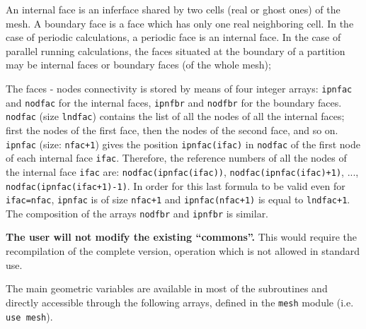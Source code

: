{{{
An internal face is an inferface shared by two cells (real or ghost
ones) of the mesh. A boundary face is a face which has only one real
neighboring cell. In the case of periodic calculations, a periodic face
is an internal face. In the case of parallel running calculations, the
faces situated at the boundary of a partition may be internal faces or
boundary faces (of the whole mesh);

\label{prg_nodfac}
The faces - nodes connectivity is stored by
means of four integer arrays: \texttt{ipnfac} and \texttt{nodfac} for the
internal faces, \texttt{ipnfbr} and \texttt{nodfbr} for the boundary faces.
\texttt{nodfac} (size \texttt{lndfac})
contains the list of all the nodes of all the internal faces; first the nodes of
the first face, then the nodes of the second face, and so on.
\texttt{ipnfac} (size: \texttt{nfac+1}) gives the position \texttt{ipnfac(ifac)}
in \texttt{nodfac} of the first node of each internal face \texttt{ifac}.
Therefore, the reference numbers of all
the nodes of the internal face \texttt{ifac} are: \texttt{nodfac(ipnfac(ifac))},
\texttt{nodfac(ipnfac(ifac)+1)}, ..., \texttt{nodfac(ipnfac(ifac+1)-1)}.
In order for this last formula to be valid even for \texttt{ifac=nfac},
\texttt{ipnfac} is of size \texttt{nfac+1} and \texttt{ipnfac(nfac+1)}
is equal to \texttt{lndfac+1}.\\
The composition of the arrays \texttt{nodfbr} and \texttt{ipnfbr} is similar.

{\bf The user will not modify the existing ``commons''.} This would require the
recompilation of the complete version, operation which is not allowed in
standard use.


The main geometric variables are available in most of the
subroutines and directly accessible through the following arrays,
defined in the \texttt{mesh} module (i.e. \texttt{use mesh}).




}}}
